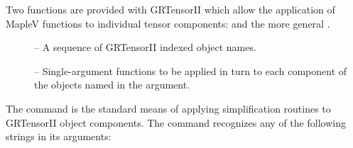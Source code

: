\documentclass{article}
\begin{document}
{{{Two functions are provided with GRTensorII which allow the application
of MapleV functions to individual tensor components: 
and the more general .\\
%
\begin{cmdspec}
  \label{spec:gralter}

  \begin{description}
    \item[] -- A sequence of GRTensorII indexed object names.
    \item[] -- Single-argument functions to be applied in
      turn to each component of the objects named in the 
      argument.
  \end{description}

\end{cmdspec}

The  command is the standard means of applying simplification
routines to GRTensorII object components. The command recognizes any of
the following strings in its  arguments:

}}}
\end{document}
